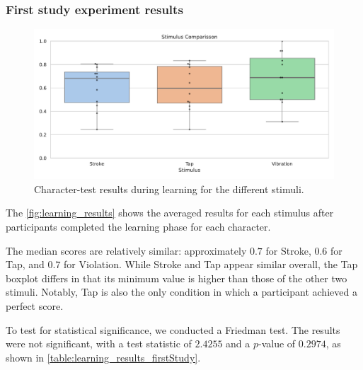 \subsubsection{First study experiment results}

\begin{figure}
    \centering
    \includegraphics[width=0.5\linewidth]{src/pictures/Study1Data_Experiment/learn_data_averaged.pdf}
    \caption{Character-test results during learning for the different stimuli.}
    \label{fig:learning_results}
\end{figure}


The \autoref{fig:learning_results} shows the averaged results for each stimulus after participants completed the learning phase for each character.

The median scores are relatively similar: approximately $0.7$ for Stroke, $0.6$ for Tap, and $0.7$ for Violation. While Stroke and Tap appear similar overall, the Tap boxplot differs in that its minimum value is higher than those of the other two stimuli. Notably, Tap is also the only condition in which a participant achieved a perfect score.

To test for statistical significance, we conducted a Friedman test. The results were not significant, with a test statistic of $2.4255$ and a $p$-value of $0.2974$, as shown in \autoref{table:learning_results_firstStudy}.


\begin{table}[ht]
\caption{Results of the Friedman significance tests during learning with a Kendall's W Effect Size.}
\label{table:learning_results_firstStudy}
\end{table}

